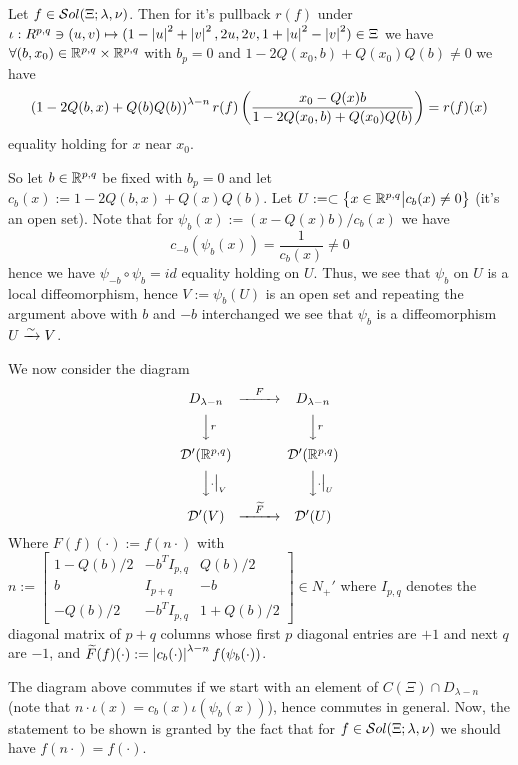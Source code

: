 \documentclass[10pt]{article} %
\newcommand{\D}{\mathcal{D}}
\theoremstyle{definition}
\theoremstyle{remark}
\begin{document}
\begin{mylem}\label{lem-3-3}
	Let $f\in \mathcal{S}ol(\Xi;\lambda,\nu)$. Then for it's pullback $r(f)$ under $\iota:R^{p,q}\ni(u,v)\mapsto
	(1-\left| u \right|^2+\left| v \right|^2,2u,2v,1+\left| u \right|^2-\left| v \right|^2)\in\Xi$ we have
	$\forall (b,x_0)\in\mathbb{R}^{ p,q }\times\mathbb{R}^{p,q}$ with $b_p=0$ and
	${ 1-2Q(x_0,b)+Q(x_0)Q(b) }\neq0$
	we have \[\left( 1-2Q(b,x)+Q(b)Q(b) \right)^{ \lambda-n }r(f)
	\left(\frac{ x_0-Q(x)b }{ 1-2Q(x_0,b)+Q(x_0)Q(b)}\right)=r(f)(x)\] equality holding for $x$ near $x_0$.
\end{mylem}
\begin{myproof}%
	So let $b\in\mathbb{R}^{p,q}$ be fixed with $b_p=0$ and let $c_b(x):=1-2Q(b,x)+Q(x)Q(b)$. Let
	$U:=\subset\left\{x\in\mathbb{R}^{p,q}\big| c_b(x)\neq0\right\}$ (it's an open set). Note that for $\psi_b(x):=(x-Q(x)b)/c_b(x)$ 
	we have \[c_{-b}(\psi_b(x))=\frac{1}{c_b(x)}\neq0\]
	hence we have $\psi_{-b}\circ\psi_b=id$ equality holding on $U$. Thus, we see that $\psi_b$ on $U$ is a local diffeomorphism,
	hence $V:=\psi_b(U)$ is an open set and repeating the argument above with $b$ and $-b$ interchanged we see that $\psi_b$
	is a diffeomorphism $U\xrightarrow{\sim} V$.

	We now consider the diagram
\[\begin{CD}
D_{\lambda-n}     @>F>>  D_{\lambda-n}\\
@VVrV        @VVrV\\
\D'(\R^{p,q})  @.     \D'(\R^{p,q})\\
@VV{\cdot\big|_V}V        @VV{\cdot\big|_U}V\\
\D'(V)     @>\widetilde{F}>>  \D'(U)
\end{CD}\]
Where $F(f)(\cdot):=f(n\cdot)$ with $n:=
\begin{bmatrix}
	1-Q(b)/2&-b^TI_{p,q}&Q(b)/2\\
	b&I_{p+q}&-b\\
	-Q(b)/2&-b^TI_{p,q}&1+Q(b)/2
\end{bmatrix}\in N_+'$ where $I_{p,q}$ denotes the diagonal matrix of $p+q$ columns
whose first $p$ diagonal entries are $+1$ and next $q$ are $-1$, and $\widetilde{F}(f)(\cdot):=\left|c_b(\cdot)\right|^{\lambda-n}
f(\psi_b(\cdot))$.

The diagram above commutes if we start with an element of $C(\Xi)\cap D_{\lambda-n}$ (note that $n\cdot\iota(x)=c_b(x)\iota(\psi_b(x))
$), hence commutes in general. Now, the statement to be shown is granted by the fact that for $f\in\mathcal{S}ol(\Xi;\lambda,\nu)$ we should have
$f(n\cdot)=f(\cdot)$.
\end{myproof}
\end{document}
